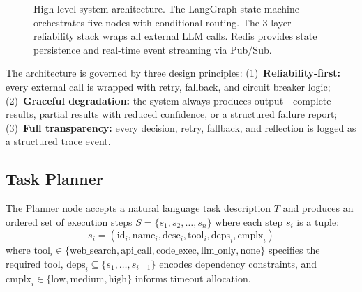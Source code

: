 \documentclass[conference]{IEEEtran}
\begin{document}
\begin{figure}[htbp]
    \centering
    \caption{High-level system architecture. The LangGraph state machine orchestrates five nodes with conditional routing. The 3-layer reliability stack wraps all external LLM calls. Redis provides state persistence and real-time event streaming via Pub/Sub.}
    \label{fig:architecture}
\end{figure}

The architecture is governed by three design principles: (1)~\textbf{Reliability-first:} every external call is wrapped with retry, fallback, and circuit breaker logic; (2)~\textbf{Graceful degradation:} the system always produces output---complete results, partial results with reduced confidence, or a structured failure report; (3)~\textbf{Full transparency:} every decision, retry, fallback, and reflection is logged as a structured trace event.

\subsection{Task Planner}

The Planner node accepts a natural language task description $T$ and produces an ordered set of execution steps $S = \{s_1, s_2, \ldots, s_n\}$ where each step $s_i$ is a tuple:
\begin{equation}
    s_i = (\textrm{id}_i, \textrm{name}_i, \textrm{desc}_i, \textrm{tool}_i, \textrm{deps}_i, \textrm{cmplx}_i)
\end{equation}
where $\textrm{tool}_i \in \{\textrm{web\_search}, \textrm{api\_call}, \textrm{code\_exec}, \textrm{llm\_only}, \textrm{none}\}$ specifies the required tool, $\textrm{deps}_i \subseteq \{s_1, \ldots, s_{i-1}\}$ encodes dependency constraints, and $\textrm{cmplx}_i \in \{\textrm{low}, \textrm{medium}, \textrm{high}\}$ informs timeout allocation.
\end{document}
